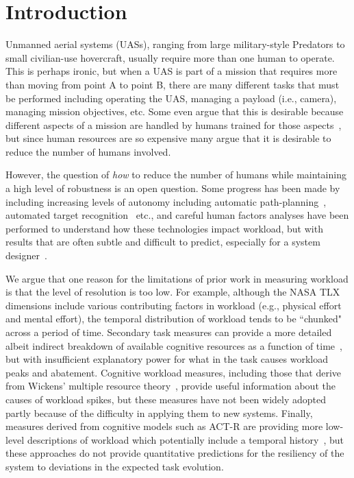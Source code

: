 \section{Introduction}

Unmanned aerial systems (UASs), ranging from large military-style Predators to small civilian-use hovercraft, usually require more than one human to operate.  This is perhaps ironic, but when a UAS is part of a mission that requires more than moving from point A to point B, there are many different tasks that must be performed including operating the UAS, managing a payload (i.e., camera), managing mission objectives, etc.  Some even argue that this is desirable because different aspects of a mission are handled by humans trained for those aspects~\cite{MurphyBurke2010}, but since human resources are so expensive many argue that it is desirable to reduce the number of humans involved.

However, the question of {\em how} to reduce the number of humans while maintaining a high level of robustness is an open question.  Some progress has been made by including increasing levels of autonomy including automatic path-planning~\cite{WongBourgaultFurukawa2005,878915,pettersson2006probabilistic,QuigleyBarberEtAl2005,NelsonBarberMcLainBeard2006}, automated target recognition~\cite{MorseEnghGoodrich2010,dasgupta2008multiagent,barber2006vision} etc., and careful human factors analyses have been performed to understand how these technologies impact workload, but with results that are often subtle and difficult to predict, especially for a system designer~\cite{KaberEndsley2004,chen2011supervisory,chen2007human}.

We argue that one reason for the limitations of prior work in measuring workload is that the level of resolution is too low.  For example, although the NASA TLX dimensions include various contributing factors in workload (e.g., physical effort and mental effort), the temporal distribution of workload tends to be ``chunked" across a period of time.  Secondary task measures can provide a more detailed albeit indirect breakdown of available cognitive resources as a function of time~\cite{kaber1999adaptive}, but with insufficient explanatory power for what in the task causes workload peaks and abatement.  Cognitive workload measures, including those that derive from Wickens' multiple resource theory~\cite{wickens2002multiple}, provide useful information about the causes of workload spikes, but these measures have not been widely adopted partly because of the difficulty in applying them to new systems.  Finally, measures derived from cognitive models such as ACT-R are providing more low-level descriptions of workload which potentially include a temporal history~\cite{lebiere2013cognitive}, but these approaches do not provide quantitative predictions for the resiliency of the system to deviations in the expected task evolution.


